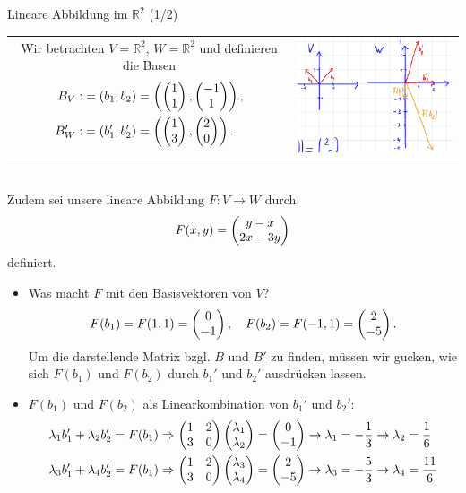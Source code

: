 \begin{Beispiel}
{Lineare Abbildung im $\mathbb{R}^2$ (1/2)}
\begin{tabular}{c l}
\parbox[b]{9cm}{
Wir betrachten $V=\mathbb{R}^2$, $W=\mathbb{R}^2$ und definieren die Basen
\begin{align*}
    B_V:&=(b_1,b_2)=\left({\begin{pmatrix}1\\1\end{pmatrix},\begin{pmatrix}-1\\1\end{pmatrix}}\right),\\ B_W':&=(b_1',b_2')=\left({\begin{pmatrix}1\\3\end{pmatrix},\begin{pmatrix}2\\0\end{pmatrix}}\right).
\end{align*}
} & \includegraphics[width=.3\textwidth]{Dateien/00/12BeispielEbeneLinAbb.PNG}
\end{tabular}\\
Zudem sei unsere lineare Abbildung $F:V\to W$ durch
\begin{equation*}
    F(x,y)=\begin{pmatrix}y-x\\2x-3y\end{pmatrix}
\end{equation*}
definiert. 
\begin{itemize}
    \item Was macht $F$ mit den Basisvektoren von $V$?
    \begin{equation*}
        F(b_1)=F(1,1)=\begin{pmatrix}0\\-1\end{pmatrix},\quad F(b_2)=F(-1,1)=\begin{pmatrix}2\\-5\end{pmatrix}.
    \end{equation*}
    Um die darstellende Matrix bzgl. $B$ und $B'$ zu finden, müssen wir gucken, wie sich $F(b_1)$ und $F(b_2)$ durch $b_1'$ und $b_2'$ ausdrücken lassen.
    \item $F(b_1)$ und $F(b_2)$ als Linearkombination von $b_1'$ und $b_2'$:
    \begin{align*}
        \lambda_1b_1'+\lambda_2b_2'=F(b_1)&\Rightarrow \Matrix{1&2\\3&0}\Matrix{\lambda_1\\\lambda_2}=\Matrix{0\\-1}\rightarrow\lambda_1=-\frac{1}{3}\rightarrow\lambda_2=\frac{1}{6}\\
        \lambda_3b_1'+\lambda_4b_2'=F(b_1)&\Rightarrow \Matrix{1&2\\3&0}\Matrix{\lambda_3\\\lambda_4}=\Matrix{2\\-5}\rightarrow\lambda_3=-\frac{5}{3}\rightarrow\lambda_4=\frac{11}{6}

\end{align*}
\end{itemize}
\end{Beispiel}
